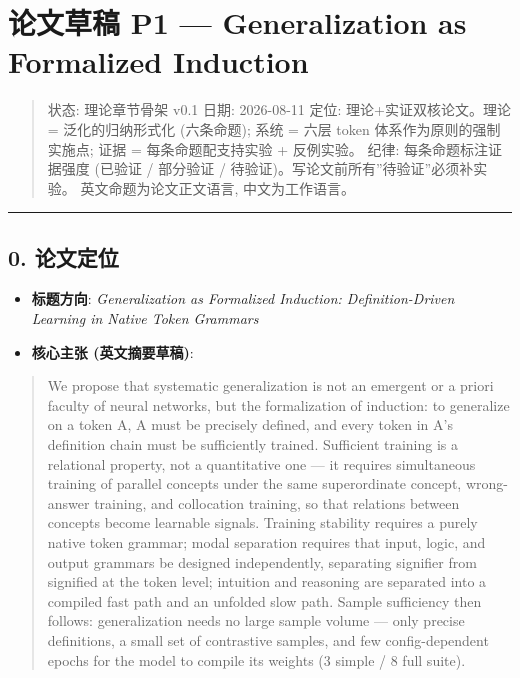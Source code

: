 \documentclass[
]{article}
\author{}
\date{}
\providecommand{\tightlist}{%
  \setlength{\itemsep}{0pt}\setlength{\parskip}{0pt}}
\begin{document}
\section{论文草稿 P1 --- Generalization as Formalized
Induction}\label{ux8bbaux6587ux8349ux7a3f-p1-generalization-as-formalized-induction}

\begin{quote}
状态: 理论章节骨架 v0.1 \textbar{} 日期: 2026-08-11 定位:
理论+实证双核论文。理论 = 泛化的归纳形式化 (六条命题); 系统 = 六层 token
体系作为原则的强制实施点; 证据 = 每条命题配支持实验 + 反例实验。 纪律:
每条命题标注证据强度 (已验证 / 部分验证 /
待验证)。写论文前所有''待验证''必须补实验。 英文命题为论文正文语言,
中文为工作语言。
\end{quote}

\begin{center}\rule{0.5\linewidth}{0.5pt}\end{center}

\subsection{0. 论文定位}\label{ux8bbaux6587ux5b9aux4f4d}

\begin{itemize}
\tightlist
\item
  \textbf{标题方向}: \emph{Generalization as Formalized Induction:
  Definition-Driven Learning in Native Token Grammars}
\item
  \textbf{核心主张 (英文摘要草稿)}:
\end{itemize}

\begin{quote}
We propose that systematic generalization is not an emergent or a priori
faculty of neural networks, but the formalization of induction: to
generalize on a token A, A must be precisely defined, and every token in
A's definition chain must be sufficiently trained. Sufficient training
is a relational property, not a quantitative one --- it requires
simultaneous training of parallel concepts under the same superordinate
concept, wrong-answer training, and collocation training, so that
relations between concepts become learnable signals. Training stability
requires a purely native token grammar; modal separation requires that
input, logic, and output grammars be designed independently, separating
signifier from signified at the token level; intuition and reasoning are
separated into a compiled fast path and an unfolded slow path. Sample
sufficiency then follows: generalization needs no large sample volume
--- only precise definitions, a small set of contrastive samples, and
few config-dependent epochs for the model to compile its weights (3
simple / 8 full suite).
\end{quote}
\end{document}
